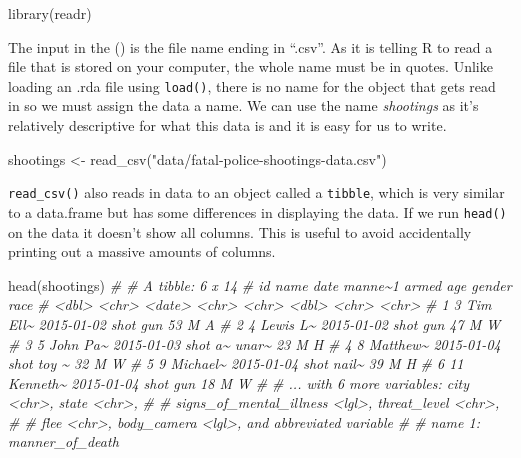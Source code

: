 \documentclass[
]{krantz}
\makeatletter
\newenvironment{Shaded}{\begin{snugshade}}{\end{snugshade}}
\newcommand{\CommentTok}[1]{\textcolor[rgb]{0.37,0.37,0.37}{\textit{#1}}}
\newcommand{\FunctionTok}[1]{\textcolor[rgb]{0,0,0}{#1}}
\newcommand{\NormalTok}[1]{#1}
\newcommand{\OtherTok}[1]{\textcolor[rgb]{0.37,0.37,0.37}{#1}}
\newcommand{\StringTok}[1]{\textcolor[rgb]{0.5,0.5,0.5}{#1}}
\newenvironment{kframe}{%
\medskip{}
\setlength{\fboxsep}{.8em}
 \def\at@end@of@kframe{}%
 \ifinner\ifhmode%
  \def\at@end@of@kframe{\end{minipage}}%
  \begin{minipage}{\columnwidth}%
 \fi\fi%
 \def\FrameCommand##1{\hskip\@totalleftmargin \hskip-\fboxsep
 \colorbox{shadecolor}{##1}\hskip-\fboxsep
     \hskip-\linewidth \hskip-\@totalleftmargin \hskip\columnwidth}%
 \MakeFramed {\advance\hsize-\width
   \@totalleftmargin\z@ \linewidth\hsize
   \@setminipage}}%
 {\par\unskip\endMakeFramed%
 \at@end@of@kframe}
\renewenvironment{Shaded}{\begin{kframe}}{\end{kframe}}
\makeatother
\begin{document}
\begin{Shaded}
\begin{Highlighting}[]
\FunctionTok{library}\NormalTok{(readr)}
\end{Highlighting}
\end{Shaded}

The input in the () is the file name ending in ``.csv''. As
it is telling R to read a file that is stored on your
computer, the whole name must be in quotes. Unlike loading
an .rda file using \texttt{load()}, there is no name for the
object that gets read in so we must assign the data a name.
We can use the name \emph{shootings} as it's relatively
descriptive for what this data is and it is easy for us to
write.

\begin{Shaded}
\begin{Highlighting}[]
\NormalTok{shootings }\OtherTok{\textless{}{-}} \FunctionTok{read\_csv}\NormalTok{(}\StringTok{"data/fatal{-}police{-}shootings{-}data.csv"}\NormalTok{)}
\end{Highlighting}
\end{Shaded}

\texttt{read\_csv()} also reads in data to an object called
a \texttt{tibble}, which is very similar to a data.frame but
has some differences in displaying the data. If we run
\texttt{head()} on the data it doesn't show all columns.
This is useful to avoid accidentally printing out a massive
amounts of columns.

\begin{Shaded}
\begin{Highlighting}[]
\FunctionTok{head}\NormalTok{(shootings)}
\CommentTok{\# \# A tibble: 6 x 14}
\CommentTok{\#      id name     date       manne\textasciitilde{}1 armed   age gender race }
\CommentTok{\#   \textless{}dbl\textgreater{} \textless{}chr\textgreater{}    \textless{}date\textgreater{}     \textless{}chr\textgreater{}   \textless{}chr\textgreater{} \textless{}dbl\textgreater{} \textless{}chr\textgreater{}  \textless{}chr\textgreater{}}
\CommentTok{\# 1     3 Tim Ell\textasciitilde{} 2015{-}01{-}02 shot    gun      53 M      A    }
\CommentTok{\# 2     4 Lewis L\textasciitilde{} 2015{-}01{-}02 shot    gun      47 M      W    }
\CommentTok{\# 3     5 John Pa\textasciitilde{} 2015{-}01{-}03 shot a\textasciitilde{} unar\textasciitilde{}    23 M      H    }
\CommentTok{\# 4     8 Matthew\textasciitilde{} 2015{-}01{-}04 shot    toy \textasciitilde{}    32 M      W    }
\CommentTok{\# 5     9 Michael\textasciitilde{} 2015{-}01{-}04 shot    nail\textasciitilde{}    39 M      H    }
\CommentTok{\# 6    11 Kenneth\textasciitilde{} 2015{-}01{-}04 shot    gun      18 M      W    }
\CommentTok{\# \# ... with 6 more variables: city \textless{}chr\textgreater{}, state \textless{}chr\textgreater{},}
\CommentTok{\# \#   signs\_of\_mental\_illness \textless{}lgl\textgreater{}, threat\_level \textless{}chr\textgreater{},}
\CommentTok{\# \#   flee \textless{}chr\textgreater{}, body\_camera \textless{}lgl\textgreater{}, and abbreviated variable}
\CommentTok{\# \#   name 1: manner\_of\_death}
\end{Highlighting}
\end{Shaded}
\end{document}
